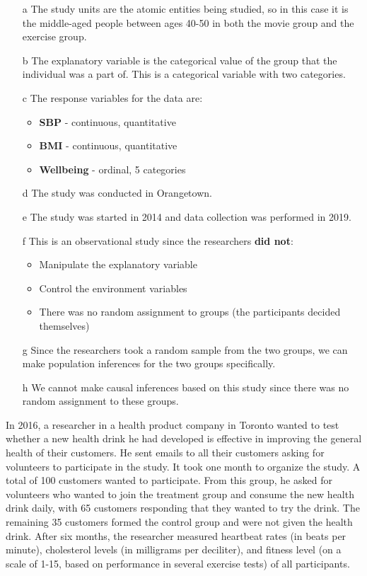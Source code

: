 \documentclass{article}
\theoremstyle{plain}
\theoremstyle{definition}
\theoremstyle{definition}
\begin{document}
\begin{answer}
    \begin{itemize}
        \item[a] The study units are the atomic entities being studied, so in this case it is the middle-aged people between ages 40-50 in both the movie group and the exercise group.
        \item[b] The explanatory variable is the categorical value of the group that the individual was a part of. This is a categorical variable with two categories.
        \item[c] The response variables for the data are:
        \begin{itemize}
            \item \textbf{SBP} - continuous, quantitative
            \item \textbf{BMI} - continuous, quantitative
            \item \textbf{Wellbeing} - ordinal, 5 categories
        \end{itemize}
        \item[d] The study was conducted in Orangetown.
        \item[e] The study was started in 2014 and data collection was performed in 2019.
        \item[f] This is an observational study since the researchers \textbf{did not}:
        \begin{itemize}
            \item Manipulate the explanatory variable
            \item Control the environment variables
            \item There was no random assignment to groups (the participants decided themselves)
        \end{itemize}
        \item[g] Since the researchers took a random sample from the two groups, we can make population inferences for the two groups specifically.
        \item[h] We cannot make causal inferences based on this study since there was no random assignment to these groups.
    \end{itemize}
\end{answer}
\begin{preamble}
    In 2016, a researcher in a health product company in Toronto wanted to test whether a new health drink
    he had developed is effective in improving the general health of their customers. He sent emails to all
    their customers asking for volunteers to participate in the study. It took one month to organize the study.
    A total of 100 customers wanted to participate. From this group, he asked for volunteers who wanted to
    join the treatment group and consume the new health drink daily, with 65 customers responding that they
    wanted to try the drink. The remaining 35 customers formed the control group and were not given the
    health drink. After six months, the researcher measured heartbeat rates (in beats per minute), cholesterol
    levels (in milligrams per deciliter), and fitness level (on a scale of 1-15, based on performance in several
    exercise tests) of all participants.
\end{preamble}
\end{document}
